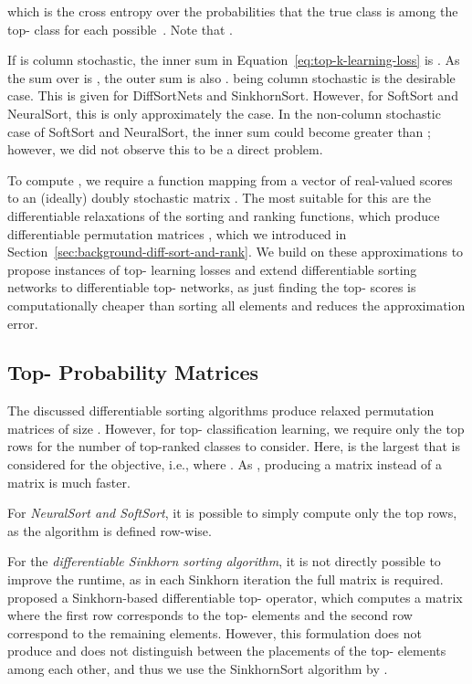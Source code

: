 \documentclass{article}
\newcommand{\revC}[1]{{#1}}
\begin{document}
which is the cross entropy over the probabilities that the true class is among the top- class for each possible~. 
Note that . 

If  is column stochastic, the inner sum in Equation~\ref{eq:top-k-learning-loss} is . 
As the sum over  is , the outer sum is also .
 being column stochastic is the desirable case. This is given for DiffSortNets and SinkhornSort. However, for SoftSort and NeuralSort, this is only approximately the case.
In the non-column stochastic case of SoftSort and NeuralSort, the inner sum could become greater than ; however, we did not observe this to be a direct problem.


To compute , we require a function mapping from a vector of real-valued scores to an (ideally) doubly stochastic matrix .
The most suitable for this are the differentiable relaxations of the sorting and ranking functions, which produce differentiable permutation matrices , which we introduced in Section~\ref{sec:background-diff-sort-and-rank}.
We build on these approximations to propose instances of top- learning losses and extend differentiable sorting networks to differentiable top- networks, as just finding the top- scores is computationally cheaper than sorting all elements and reduces the approximation error.



\subsection{Top- Probability Matrices}

The discussed differentiable sorting algorithms produce relaxed permutation matrices of size .
However, for top- classification learning, we require only the top  rows for the number  of top-ranked classes to consider.
\revC{Here,  is the largest  that is considered for the objective, i.e., where .}
As , producing a  matrix instead of a  matrix is much faster.


For \textit{NeuralSort and SoftSort}, it is possible to simply compute only the top rows, as the algorithm is defined row-wise. 

For the \textit{differentiable Sinkhorn sorting algorithm}, it is not directly possible to improve the runtime, as in each Sinkhorn iteration the full matrix is required. 
\citet{xie2020differentiable} proposed a Sinkhorn-based differentiable top- operator, which
computes a  matrix where the first row corresponds to the top- elements and the second row correspond to the remaining elements. However, this formulation does not produce  and does not distinguish between the placements
of the top- elements among each other, and thus we use the SinkhornSort algorithm by \citet{Cuturi2019-SortingOT}.
\end{document}
